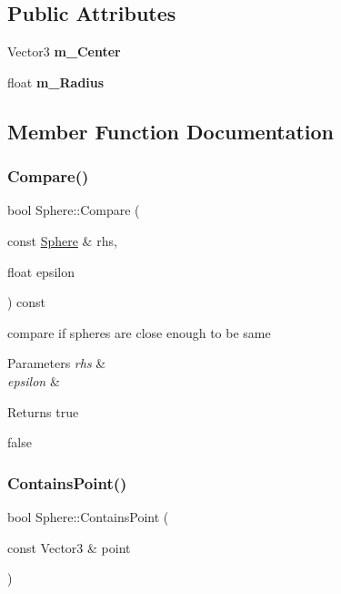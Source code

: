 \subsection*{Public Attributes}
\begin{DoxyCompactItemize}
\item 
\mbox{\label{classSphere_a246d1e074e26dab165c5e7847618649c}} 
Vector3 {\bfseries m\+\_\+\+Center}
\item 
\mbox{\label{classSphere_a013e6356f37b24bddda33ff36bfdcd76}} 
float {\bfseries m\+\_\+\+Radius}
\end{DoxyCompactItemize}


\subsection{Member Function Documentation}
\mbox{\label{classSphere_adf99590b58fce09c26fa79041efa0b65}} 
\subsubsection{\texorpdfstring{Compare()}{Compare()}}
{\footnotesize\ttfamily bool Sphere\+::\+Compare (\begin{DoxyParamCaption}\item[{const \hyperlink{classSphere}{Sphere} \&}]{rhs,  }\item[{float}]{epsilon }\end{DoxyParamCaption}) const}



compare if spheres are close enough to be same 


\begin{DoxyParams}{Parameters}
{\em rhs} & \\
\hline
{\em epsilon} & \\
\hline
\end{DoxyParams}
\begin{DoxyReturn}{Returns}
true 

false 
\end{DoxyReturn}
\mbox{\label{classSphere_afb32becb53288c8be90572047e996042}} 
\subsubsection{\texorpdfstring{Contains\+Point()}{ContainsPoint()}}
{\footnotesize\ttfamily bool Sphere\+::\+Contains\+Point (\begin{DoxyParamCaption}\item[{const Vector3 \&}]{point }\end{DoxyParamCaption})}



